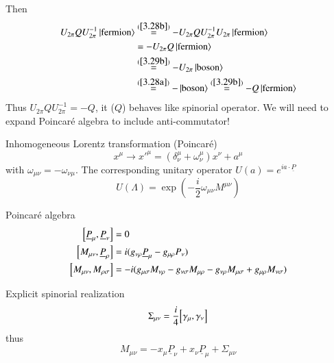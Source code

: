 Then
\begin{align*}
   U_{2\pi} Q U^{-1}_{2\pi} \ket{\text{fermion}} & \stackrel{(\ref{3.28b})}{=} - U_{2\pi} Q U^{-1}_{2\pi} U_{2\pi} \ket{\text{fermion}} \\
                                                 &= - U_{2\pi} Q \ket{\text{fermion}} \\
                                                 &\stackrel{(\ref{3.29b})}{=} - U_{2\pi} \ket{\text{boson}} \\
                                                 & \stackrel{(\ref{3.28a})}{=} - \ket{\text{boson}} \stackrel{(\ref{3.29b})}{=} - Q \ket{\text{fermion}}
\end{align*}
Thus $U_{2\pi} Q U^{-1}_{2\pi} = - Q$, it ($Q$) behaves like spinorial operator. We will need to expand Poincaré algebra to include anti-commutator!

Inhomogeneous Lorentz transformation (Poincaré)
\begin{equation}
   x^\mu \rightarrow x'^{\mu}  = (\delta^\mu_\nu + \omega^\mu_\nu) x^\nu + a^\mu \label{3.30}
\end{equation}
with $\omega_{\mu\nu} = - \omega_{\nu\mu}$. The corresponding unitary operator $U(a) = e^{i a\cdot \underline{P}}$
\begin{equation}
   U(\Lambda) = \exp(- \frac{i}{2} \omega_{\mu\nu} M^{\mu\nu}) \label{3.31}
\end{equation}

Poincaré algebra
\begin{subequations}
   \label{3.32}
\begin{align}
   \comm{\underline{P}_\mu}{\underline{P}_\nu} &= 0 \label{3.32a} \\
   \comm{M_{\mu\nu}}{\underline{P}_\rho} &= i (g_{\nu\rho} \underline{P}_\mu - g_{\mu\rho} P_\nu) \label{3.32b} \\
   \comm{M_{\mu\nu}}{M_{\rho\sigma}} &= -i (g_{\mu\sigma}M_{\nu\rho} - g_{\nu\sigma} M_{\mu\rho} - g_{\nu\rho} M_{\mu\sigma} + g_{\mu\rho} M_{\nu\sigma}) \label{3.32c}
\end{align}
\end{subequations}

Explicit spinorial realization
\begin{equation}
   \Sigma_{\mu\nu} = \frac{i}{4} \comm{\gamma_\mu}{\gamma_\nu}
\end{equation}
thus
\begin{equation}
   M_{\mu\nu} = - x_\mu \underline{P}_\nu + x_\nu \underline{P}_\mu + \Sigma_{\mu\nu} \label{3.35}
\end{equation}

